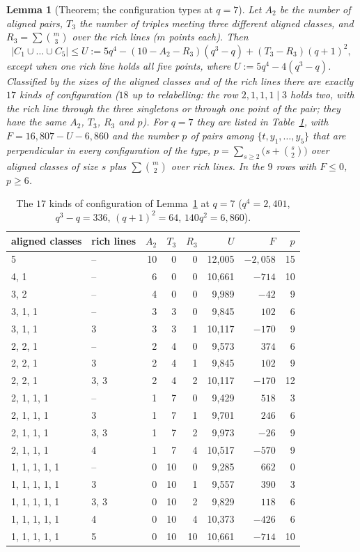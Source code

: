 \documentclass[11pt]{amsart}
\theoremstyle{plain}
\newtheorem{lemma}{Lemma}[section]
\theoremstyle{definition}
\theoremstyle{remark}
\begin{document}
\begin{lemma}[Theorem; the configuration types at $q = 7$]\label{lem:types}
Let $A_2$ be the number of aligned pairs, $T_3$ the number of triples meeting three different aligned classes, and
$R_3 = \sum \binom{m}{3}$ over the rich lines ($m$ points each). Then
\[
|C_1 \cup \dots \cup C_5| \le U := 5q^4 - (10 - A_2 - R_3)(q^3 - q) + (T_3 - R_3)(q+1)^2,
\]
except when one rich line holds all five points, where $U := 5q^4 - 4(q^3 - q)$. Classified by the sizes of the aligned
classes and of the rich lines there are exactly $17$ kinds of configuration ($18$ up to relabelling: the row
$2,1,1,1 \mid 3$ holds two, with the rich line through the three singletons or through one point of the pair; they have
the same $A_2$, $T_3$, $R_3$ and $p$). For $q = 7$ they are listed in Table~\ref{tab:types}, with
$F = 16{,}807 - U - 6{,}860$ and the number $p$ of pairs among $\{t, y_1, \dots, y_5\}$ that are perpendicular in every
configuration of the type, $p = \sum_{s \ge 2}\bigl(s + \binom{s}{2}\bigr)$ over aligned classes of size $s$ plus
$\sum \binom{m}{2}$ over rich lines. In the $9$ rows with $F \le 0$, $p \ge 6$.
\end{lemma}

\begin{table}[ht]
\centering\small
\begin{tabular}{@{}llrrrrrr@{}}
\toprule
aligned classes & rich lines & $A_2$ & $T_3$ & $R_3$ & $U$ & $F$ & $p$\\
\midrule
5 & -- & 10 & 0 & 0 & 12,005 & $-2{,}058$ & 15\\
4, 1 & -- & 6 & 0 & 0 & 10,661 & $-714$ & 10\\
3, 2 & -- & 4 & 0 & 0 & 9,989 & $-42$ & 9\\
3, 1, 1 & -- & 3 & 3 & 0 & 9,845 & $102$ & 6\\
3, 1, 1 & 3 & 3 & 3 & 1 & 10,117 & $-170$ & 9\\
2, 2, 1 & -- & 2 & 4 & 0 & 9,573 & $374$ & 6\\
2, 2, 1 & 3 & 2 & 4 & 1 & 9,845 & $102$ & 9\\
2, 2, 1 & 3, 3 & 2 & 4 & 2 & 10,117 & $-170$ & 12\\
2, 1, 1, 1 & -- & 1 & 7 & 0 & 9,429 & $518$ & 3\\
2, 1, 1, 1 & 3 & 1 & 7 & 1 & 9,701 & $246$ & 6\\
2, 1, 1, 1 & 3, 3 & 1 & 7 & 2 & 9,973 & $-26$ & 9\\
2, 1, 1, 1 & 4 & 1 & 7 & 4 & 10,517 & $-570$ & 9\\
1, 1, 1, 1, 1 & -- & 0 & 10 & 0 & 9,285 & $662$ & 0\\
1, 1, 1, 1, 1 & 3 & 0 & 10 & 1 & 9,557 & $390$ & 3\\
1, 1, 1, 1, 1 & 3, 3 & 0 & 10 & 2 & 9,829 & $118$ & 6\\
1, 1, 1, 1, 1 & 4 & 0 & 10 & 4 & 10,373 & $-426$ & 6\\
1, 1, 1, 1, 1 & 5 & 0 & 10 & 10 & 10,661 & $-714$ & 10\\
\bottomrule
\end{tabular}
\caption{The $17$ kinds of configuration of Lemma~\ref{lem:types} at $q = 7$ ($q^4 = 2{,}401$, $q^3 - q = 336$,
$(q+1)^2 = 64$, $140q^2 = 6{,}860$).}
\label{tab:types}
\end{table}
\end{document}
